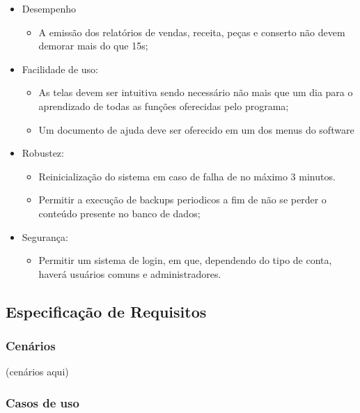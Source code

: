 \documentclass[a4paper,10pt]{article}
\begin{document}
\begin{itemize}

\item Desempenho
\begin{itemize}
\item A emissão dos relatórios de vendas, receita, peças e conserto não devem demorar mais do que 15s;
\end{itemize}
\item Facilidade de uso:
\begin{itemize}
\item As telas devem ser intuitiva sendo necessário não mais que um dia para o aprendizado de todas as funções oferecidas pelo programa;
\item Um documento de ajuda deve ser oferecido em um dos menus do software
\end{itemize}
\item Robustez:
\begin{itemize}
\item Reinicialização do sistema em caso de falha de no máximo 3 minutos.
\item Permitir a execução de backups periodicos a fim de não se perder o conteúdo presente no banco de dados;
\end{itemize}
\item Segurança:
\begin{itemize}
\item Permitir um sistema de login, em que, dependendo do tipo de conta, haverá usuários comuns e administradores.
\end{itemize}
\end{itemize}
\subsection{Especificação de Requisitos}

\subsubsection{Cenários}
(cenários aqui)

\subsubsection{Casos de uso}

\end{document}
